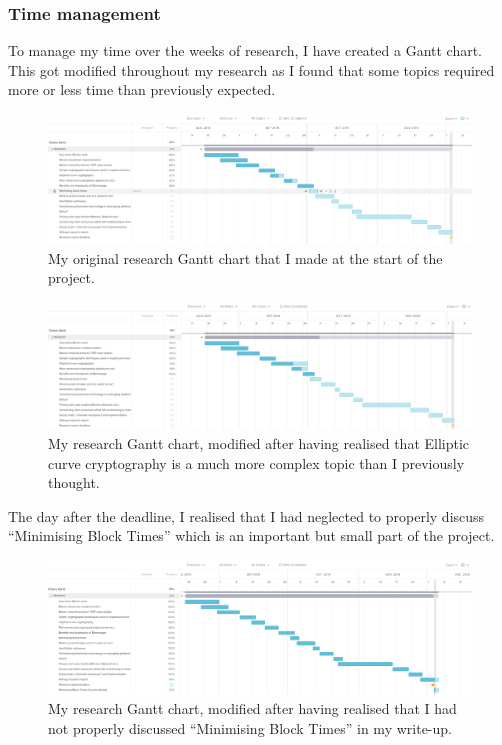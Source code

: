 \documentclass{article}
\begin{document}
\subsubsection{Time management}
To manage my time over the weeks of research, I have created a Gantt chart. This got modified throughout my research as I found that some topics required more or less time than previously expected.
\begin{figure}[h]
    \centering
    \includegraphics[width=0.9\linewidth]{Images/Gantt_before_ec.png}
    \caption{My original research Gantt chart that I made at the start of the project.}
    \label{fig:ganttbefore}
\end{figure}
\begin{figure}[h]
    \centering
    \includegraphics[width=0.9\linewidth]{Images/Gantt_after_ec.png}
    \caption{My research Gantt chart, modified after having realised that Elliptic curve cryptography is a much more complex topic than I previously thought.}
    \label{fig:terec}
\end{figure}

The day after the deadline, I realised that I had neglected to properly discuss ``Minimising Block Times'' which is an important but small part of the project.
\begin{figure}[h]
    \centering
    \includegraphics[width=0.9\linewidth]{Images/Gantt_after_uncle.png}
    \caption{My research Gantt chart, modified after having realised that I had not properly discussed ``Minimising Block Times'' in my write-up.}
    \label{fig:teruncle}
\end{figure}
\newpage
\end{document}
